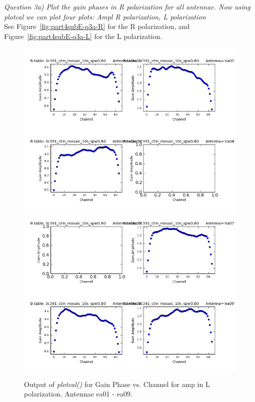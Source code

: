 \documentclass[12pt, a4paper]{article}
\begin{document}
\noindent \textit{Question 3a) Plot the gain phases in R polarization for all antennae. Now using plotcal we can plot four plots: Ampl R polarization, L polarization} \\
See Figure~\ref{fig:part4subE-q3a-R} for the R polarization, and Figure~\ref{fig:part4subE-q3a-L} for the L polarization. \\

\newpage
\begin{figure}[h!]
\centering
\includegraphics[scale=0.65]{../Imaging/plots2/part4-subE-question3a_amp_pol-L-ea01-ea04.png}
\includegraphics[scale=0.65]{../Imaging/plots2/part4-subE-question3a_amp_pol-L-ea05-ea09.png}
\caption{Output of \emph{plotcal()} for Gain Phase vs. Channel for amp in L polarization. Antennae ea01 - ea09.}
\end{figure}
\addtocounter{figure}{-1}
\end{document}
